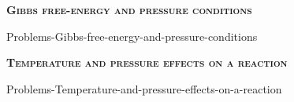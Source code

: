 \documentclass[main.tex]{subfiles}
\begin{document}
\begin{multicols*}{2}
{\raggedright\textsc{\textbf{Gibbs free-energy and pressure conditions}}\par}{Problems-Gibbs-free-energy-and-pressure-conditions}


{\raggedright\textsc{\textbf{Temperature and pressure effects on a reaction}}\par}{Problems-Temperature-and-pressure-effects-on-a-reaction}




\end{multicols*} \iftoggle{showfinalanswers}{
\newpage\fancyhfoffset[E,O]{0pt}
\begin{answerbox}
\begin{answersenvironment}
 \begin{localsize}{10}
{ \checkoddpage\ifoddpage    \else   \clearpage\thispagestyle{empty}\mbox{}\clearpage\fi
\Large \bf Answers}
\SetupExSheets{ headings = inline-nr , counter-format = qu) ,}
\providetoggle{printOddAnswers}\settoggle{printOddAnswers}{\printOddAnswers}\iftoggle{printOddAnswers}{\printsolutions[section] }{\printsolutions}
  \vspace{20cm}
 \end{localsize}
 \end{answersenvironment}
\end{answerbox}
}{}
\checkoddpage\ifoddpage   \clearpage\thispagestyle{empty}\mbox{}\clearpage \else   \fi
\end{document}
